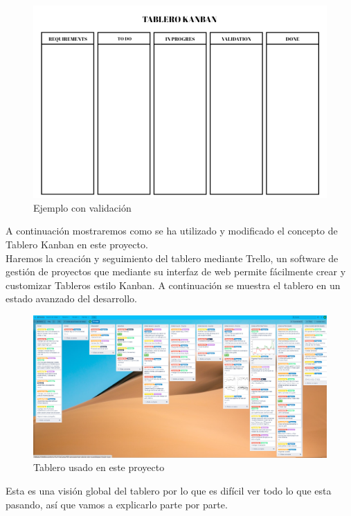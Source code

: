 \documentclass[12pt,a4paper]{article}
\begin{document}
	\begin{figure}[H]
\centering
  \centering
  \includegraphics[width=0.5\linewidth]{tablero kanban validation}
\caption{Ejemplo con validación}
\label{fig:subrgrafo}
\end{figure}
	A continuación mostraremos como se ha utilizado y modificado el concepto de Tablero Kanban en este proyecto.\\
	Haremos la creación y seguimiento del tablero mediante Trello, un software de gestión de proyectos que mediante su interfaz de web permite fácilmente crear y customizar Tableros estilo Kanban. A continuación se muestra el tablero en un estado avanzado del desarrollo.\\
\begin{figure}[H]
\centering
  \centering
  \includegraphics[width=1\linewidth]{trello}
\caption{Tablero usado en este proyecto}
\label{fig:subrgrafo}
\end{figure}
	Esta es una visión global del tablero por lo que es difícil ver todo lo que esta pasando, así que vamos a explicarlo parte por parte.\\
\end{document}
